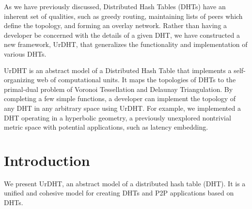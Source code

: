 
As we have previously discussed, Distributed Hash Tables (DHTs) have an inherent set of qualities, such as greedy routing, maintaining lists of peers which define the topology, and forming an overlay network.
Rather than having a developer be concerned with the details of a given DHT, we have constructed a new framework, UrDHT, that generalizes the functionality and implementation of various DHTs.

UrDHT is an abstract model of a Distributed Hash Table that implements a self-organizing web of computational units.
It maps the topologies of DHTs to the primal-dual problem of Voronoi Tessellation and Delaunay Triangulation.
By completing a few simple functions, a developer can implement the topology of any DHT in any arbitrary space using UrDHT.
For example, we implemented a DHT operating in a hyperbolic geometry, a previously unexplored nontrivial metric space with potential applications, such as latency embedding.


	

\section{Introduction}





We present UrDHT, an abstract model of a distributed hash table (DHT). %
It is a unified and cohesive model for creating DHTs and P2P applications based on DHTs.
%

